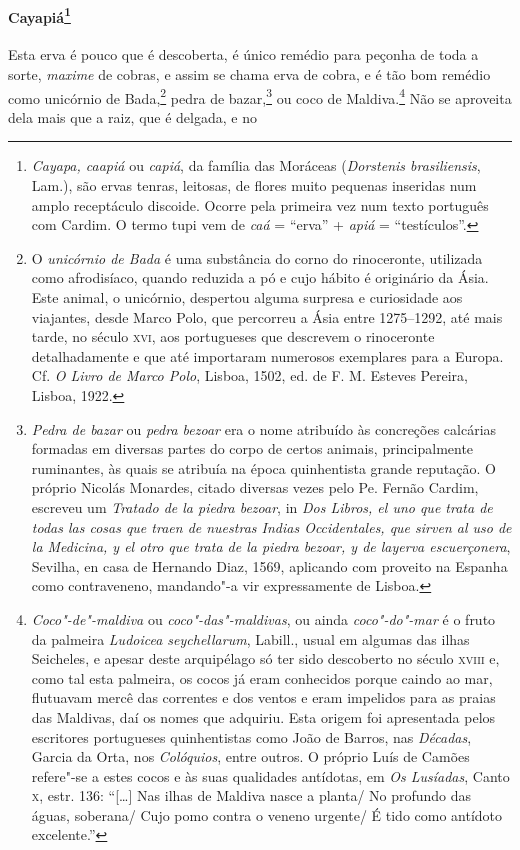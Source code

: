 \paragraph{Cayapiá\footnote{ \textit{Cayapa, caapiá} ou \textit{capiá},
da família das Moráceas (\textit{Dorstenis brasiliensis}, Lam.), são
ervas tenras, leitosas, de flores muito pequenas inseridas num amplo
receptáculo discoide. Ocorre pela primeira vez num texto português com
Cardim. O termo tupi vem de \textit{caá} = ``erva'' + \textit{apiá} = ``testículos''.}} 
Esta erva é pouco que é descoberta, é único
remédio para peçonha de toda a sorte, \textit{maxime} de cobras, e assim se chama
erva de cobra, e é tão bom remédio como unicórnio de Bada,\footnote{ O
\textit{unicórnio de Bada} é uma substância do corno do rinoceronte,
utilizada como afrodisíaco, quando reduzida a pó e cujo hábito é
originário da Ásia. Este animal, o unicórnio, despertou alguma surpresa
e curiosidade aos viajantes, desde Marco Polo, que percorreu a Ásia
entre 1275--1292, até mais tarde, no século \textsc{xvi}, aos portugueses que
descrevem o rinoceronte detalhadamente e que até importaram numerosos
exemplares para a Europa. Cf. \textit{O Livro de Marco Polo}, Lisboa,
1502, ed. de F. M. Esteves Pereira, Lisboa, 1922.} pedra de 
bazar,\footnote{ \textit{Pedra de bazar} ou \textit{pedra bezoar} era o
nome atribuído às concreções calcárias formadas em diversas partes
do corpo de certos animais, principalmente ruminantes, às quais se
atribuía na época quinhentista grande reputação. O próprio Nicolás
Monardes, citado diversas vezes pelo Pe. Fernão Cardim, escreveu um
\textit{Tratado de la piedra bezoar}, in \textit{Dos Libros, el uno que
trata de todas las cosas que traen de nuestras Indias Occidentales,
que sirven al uso de la Medicina, y el otro que trata de la piedra
bezoar, y de layerva escuerçonera}, Sevilha, en casa de Hernando Diaz,
1569, aplicando com proveito na Espanha como contraveneno,
mandando"-a vir expressamente de Lisboa.} ou coco de 
Maldiva.\footnote{ \textit{Coco"-de"-maldiva} 
ou \textit{coco"-das"-maldivas}, ou ainda
\textit{coco"-do"-mar} é o fruto da palmeira \textit{Ludoicea
seychellarum}, Labill., usual em algumas das ilhas Seicheles, e apesar
deste arquipélago só ter sido descoberto no século \textsc{xviii} e, como tal
esta palmeira, os cocos já eram conhecidos porque caindo ao mar,
flutuavam mercê das correntes e dos ventos e eram impelidos para as
praias das Maldivas, daí os nomes que adquiriu. Esta origem foi
apresentada pelos escritores portugueses quinhentistas como João de
Barros, nas \textit{Décadas}, Garcia da Orta, nos \textit{Colóquios}, 
entre outros. O próprio Luís de Camões refere"-se a estes cocos e às
suas qualidades antídotas, em \textit{Os Lusíadas}, Canto \textsc{x}, estr. 136:
 ``[\ldots{}] Nas ilhas de Maldiva nasce a planta/ No profundo das águas,
soberana/ Cujo pomo contra o veneno urgente/ É tido como antídoto
excelente.''} Não se aproveita dela mais que a raiz, que é delgada, e no

